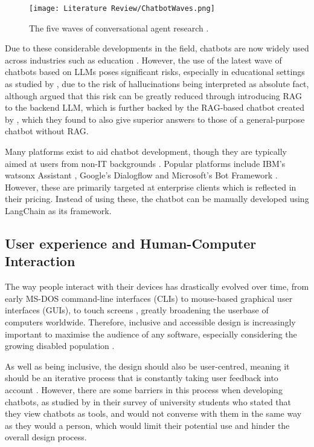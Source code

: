 \begin{figure}[H] 
    \centering
    \texttt{[image: Literature Review/ChatbotWaves.png]}
    \caption{The five waves of conversational agent research \autocite{schobel_charting_2024}.}
    \label{fig:ChatbotWaves}
\end{figure}

Due to these considerable developments in the field, chatbots are now widely used 
across industries such as education \autocite{kuhail_interacting_2023}. However, the use of the latest wave of chatbots based on LLMs
poses significant risks, especially in educational settings as studied by \textcite{neumann_llm-driven_2024},
due to the risk of hallucinations being interpreted as absolute fact, although \textcite{shuster_retrieval_2021} 
argued that this risk can be greatly reduced through introducing RAG to the backend LLM, which is further backed 
by the RAG-based chatbot created by \textcite{ge_development_2023}, which they found to also give superior answers
to those of a general-purpose chatbot without RAG.  


Many platforms exist to aid chatbot development, though they are typically aimed at users from non-IT backgrounds 
\autocite{srivastava_desirable_2020}. Popular platforms include IBM's watsonx Assistant \autocite{ibm_ibm_2024},
Google's Dialogflow \autocite{google_conversational_nodate} and Microsoft's Bot Framework \autocite{microsoft_microsoft_nodate}.
However, these are primarily targeted at enterprise clients which is reflected in their pricing. Instead of using these,
the chatbot can be manually developed using LangChain as its framework.



\subsection{User experience and Human-Computer Interaction}

The way people interact with their devices has drastically evolved over time, from early MS-DOS command-line 
interfaces (CLIs) to mouse-based graphical user interfaces (GUIs), to touch screens \autocite{kotian_systematic_2024}, greatly broadening
the userbase of computers worldwide. Therefore, inclusive and accessible design is increasingly important to maximise the audience of any software,
especially considering the growing disabled population \autocite{putnam_how_2012}. 

As well as being inclusive, the design 
should also be user-centred, meaning it should be an iterative process that is constantly taking user feedback 
into account \autocite{chammas_closer_2015}. However, there are some barriers in this process when developing 
chatbots, as studied by \textcite{clark_what_2019} in their survey of university students who stated that they view 
chatbots as tools, and would not converse with them in the same way as they would a person, which would 
limit their potential use and hinder the overall design process. 

